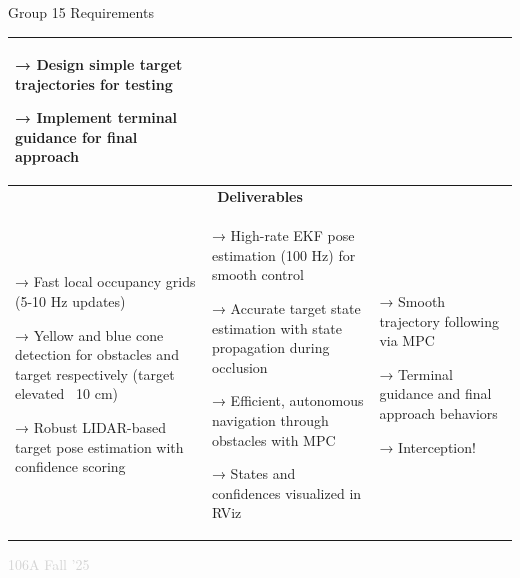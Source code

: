 \documentclass[aspectratio=169]{beamer}
\begin{document}
\begin{frame}{Group 15 Requirements}
\begin{table}[h]
\begin{tabular}{|p{}|p{}|p{}|}
→ Design simple target trajectories for testing

→ Implement terminal guidance for final approach \\
\hline
\hline
\multicolumn{3}{|c|}{\textcolor{slidegreen}{\textbf{Deliverables}}} \\
\hline
\vspace{0.1cm}
→ Fast local occupancy grids (5-10 Hz updates)

→ Yellow and blue cone detection for obstacles and target respectively (target elevated ~10 cm)

→ Robust LIDAR-based target pose estimation with confidence scoring & → High-rate EKF pose estimation (100 Hz) for smooth control

→ Accurate target state estimation with state propagation during occlusion

→ Efficient, autonomous navigation through obstacles with MPC

→ States and confidences visualized in RViz & → Smooth trajectory following via MPC

→ Terminal guidance and final approach behaviors

→ Interception! \\
\hline
\end{tabular}
\end{table}

\vspace{0.2cm}
\textcolor{lightgray}{\tiny 106A Fall '25}

\end{frame}
\end{document}

